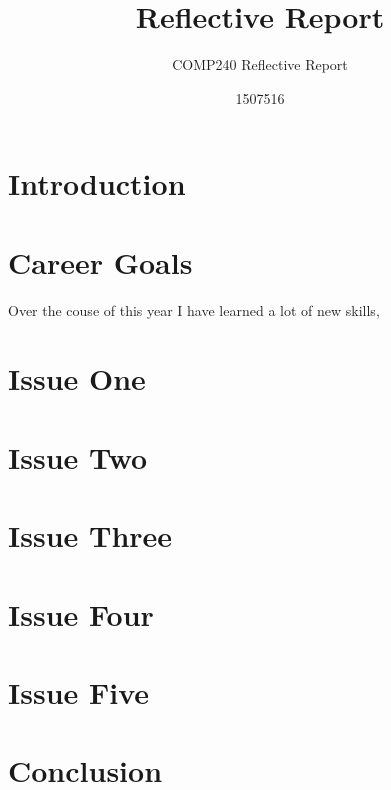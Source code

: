 \documentclass{scrartcl}
\title{Reflective Report}
\subtitle{COMP240 Reflective Report}
\author{1507516}
\begin{document}
\maketitle


\section{Introduction}


\section{Career Goals}
Over the couse of this year I have learned a lot of new skills, 
\section{Issue One}
\section{Issue Two}
\section{Issue Three}
\section{Issue Four}
\section{Issue Five}

\section{Conclusion}
\end{document}
